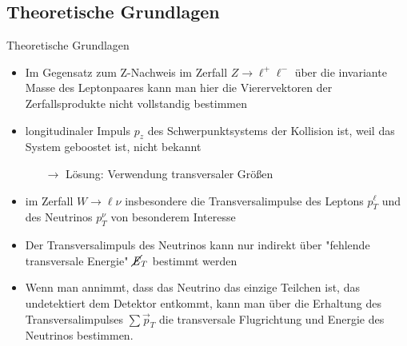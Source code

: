 \documentclass[aspectratio=1610, 9pt]{beamer}
\begin{document}
\subsection{Theoretische Grundlagen}
\begin{frame}{Theoretische Grundlagen}
   \begin{itemize}
     \item Im Gegensatz zum Z-Nachweis im Zerfall $Z \rightarrow \ell^+ \ell^-$ über die invariante Masse des Leptonpaares kann man hier die Vierervektoren der Zerfallsprodukte nicht vollstandig bestimmen
     \item longitudinaler Impuls $p_z$ des Schwerpunktsystems der Kollision ist, weil das System geboostet ist, nicht bekannt
     \begin{itemize}
       \item[$\rightarrow$] Lösung: Verwendung transversaler Größen
     \end{itemize}
   \end{itemize}
\end{frame}

\begin{frame}
  \begin{itemize}
    \item im Zerfall $W \rightarrow \ell \nu$ insbesondere die Transversalimpulse des Leptons $p^\ell_T$ und des Neutrinos $p^\nu_T$ von besonderem Interesse
    \item Der Transversalimpuls des Neutrinos kann nur indirekt über "fehlende transversale Energie"  $\cancel{\it{E}}_{T}$ bestimmt werden
    \item Wenn man annimmt, dass das Neutrino das einzige Teilchen ist, das undetektiert dem Detektor entkommt, kann man über die Erhaltung des Transversalimpulses $\sum \vec{p}_T$ die transversale Flugrichtung und Energie des Neutrinos bestimmen.
  \end{itemize}
\end{frame}
\end{document}
